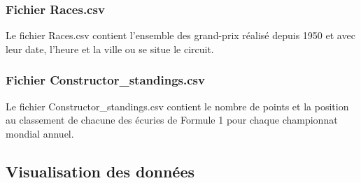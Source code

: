 \subsubsection{Fichier Races.csv}
Le fichier Races.csv contient l'ensemble des grand-prix réalisé depuis 1950 et avec leur date, l'heure et la ville ou se situe le circuit.

\subsubsection{Fichier Constructor\_standings.csv}
Le fichier Constructor\_standings.csv contient le nombre de points et la position au classement de chacune des écuries de Formule 1 pour chaque championnat mondial annuel.

\newpage

\subsection{Visualisation des données}









